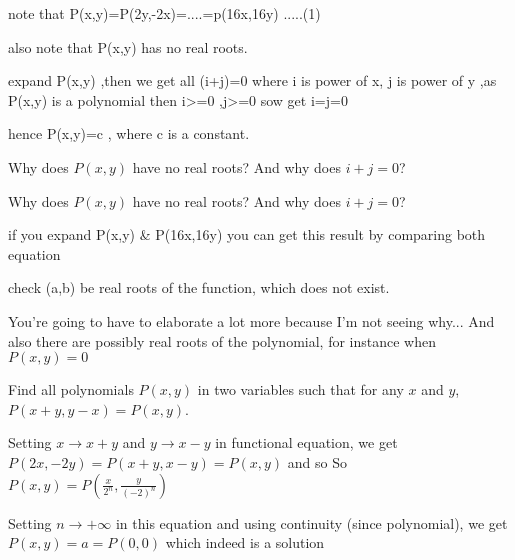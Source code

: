 \begin{solution}
	note that P(x,y)=P(2y,-2x)=....=p(16x,16y)        .....(1)

  also note that P(x,y) has no real roots. 
  
expand P(x,y) ,then we get all (i+j)=0 where i is power of x, j is power of y ,as P(x,y) is a polynomial then i>=0 ,j>=0  sow get i=j=0 

                               hence P(x,y)=c      ,  where c is a constant.
\end{solution}



\begin{solution}
	Why does $P(x,y)$ have no real roots? And why does $i+j=0$?
\end{solution}



\begin{solution}
	\begin{tcolorbox}Why does $P(x,y)$ have no real roots? And why does $i+j=0$?\end{tcolorbox}
if you expand P(x,y) & P(16x,16y) you can get this result by comparing both equation 
   
      check (a,b) be real roots of the function, which does not exist.
\end{solution}



\begin{solution}
	You're going to have to elaborate a lot more because I'm not seeing why...
And also there are possibly real roots of the polynomial, for instance when $P(x,y) = 0$
\end{solution}



\begin{solution}
	\begin{tcolorbox}Find all polynomials $P(x,y)$ in two variables such that for any $x$ and $y$, $P(x+y,y-x)=P(x,y)$.\end{tcolorbox}
Setting $x\to x+y$ and $y\to x-y$ in functional equation, we get $P(2x,-2y)=P(x+y,x-y)=P(x,y)$ and so So $P(x,y)=P(\frac x{2^n},\frac y{(-2)^n})$

Setting $n\to +\infty$ in this equation and using continuity (since polynomial), we get $\boxed{P(x,y)=a}=P(0,0)$ which indeed is a solution
\end{solution}



